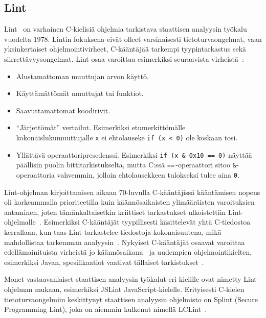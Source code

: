 \subsection{Lint}

Lint~\cite{Lint} on varhainen C-kielisiä ohjelmia tarkistava staattisen analyysin työkalu vuodelta 1978.
Lintin fokuksena eivät olleet varsinaisesti tietoturvaongelmat,
vaan yksinkertaiset ohjelmointivirheet, C-kääntäjää tarkempi tyypintarkastus sekä siirrettävyysongelmat.
Lint osaa varoittaa esimerkiksi seuraavista virheistä~\cite{Lint}:

\begin{itemize}
    \item Alustamattoman muuttujan arvon käyttö.
    \item Käyttämättömät muuttujat tai funktiot.
    \item Saavuttamattomat koodirivit.
    \item ``Järjettömät'' vertailut.
           Esimerkiksi etumerkittömälle kokonaislukumuuttujalle \texttt{x} ei ehtolauseke
           \texttt{if (x < 0)} ole koskaan tosi.
   \item Yllättävä operaattoripresedenssi.
         Esimerkiksi \texttt{if (x \& 0x10 == 0)} näyttää päällisin puolin bittitarkistukselta,
         mutta C:ssä \texttt{==}\,-operaattori sitoo \texttt{\&}-operaattoria vahvemmin,
         jolloin ehtolausekkeen tulokseksi tulee aina \texttt{0}.
\end{itemize}

Lint-ohjelman kirjoittamisen aikaan 70-luvulla C-kääntäjissä kääntämisen nopeus oli
korkeammalla prioriteetilla kuin käännösaikaisten ylimääräisten varoituksien antaminen,
joten tämänkaltaisetkin kriittiset tarkastukset ulkoistettiin Lint-ohjelmalle~\cite{Lint}.
Esimerkiksi C-kääntäjät tyypillisesti käsittelevät yhtä C-tiedostoa kerrallaan,
kun taas Lint tarkastelee tiedostoja kokonaisuutena,
mikä mahdollistaa tarkemman analyysin~\cite{Lint}.
Nykyiset C-kääntäjät osaavat varoittaa e\-del\-lä\-mai\-ni\-tuis\-ta virheistä
jo käännösaikana~\cite{SecurityRootOfTheProblem} ja uudempien ohjelmointikielten,
esimerkiksi Javan, spesifikaatiot vaativat tällaiset tarkistukset~\cite[22.3]{Sommerville}.

Monet vastaavanlaiset staattisen analyysin työkalut eri kielille ovat nimetty
Lint-ohjelman mukaan, esimerkiksi JSLint JavaScript-kielelle.
Erityisesti C-kielen tietoturvaongelmiin keskittynyt staattisen analyysin ohjelmisto on Splint
(Secure Programming Lint), joka on aiemmin kulkenut nimellä LCLint~\cite{SplintLCLint}.

